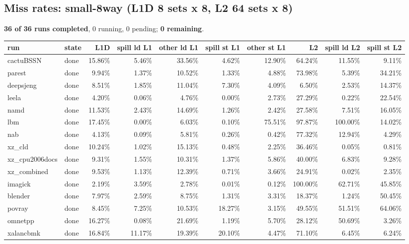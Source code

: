 \documentclass[10pt,a4paper,landscape]{article}
\begin{document}
\subsection*{Miss rates: small-8way (L1D 8 sets x 8, L2 64 sets x 8)}
\textbf{36 of 36 runs completed}, 0 running, 0 pending; \textbf{0 remaining}.\par
{\footnotesize
\begin{longtable}{llrrrrrrrr}
\toprule
run & state & L1D & spill ld L1 & other ld L1 & spill st L1 & other st L1 & L2 & spill ld L2 & spill st L2 \\
\midrule
\endhead
\bottomrule
\endfoot
cactuBSSN & done & 15.86\% & 5.46\% & 33.56\% & 4.62\% & 12.90\% & 64.24\% & 11.55\% & 9.11\% \\
parest & done & 9.94\% & 1.37\% & 10.52\% & 1.33\% & 4.88\% & 73.98\% & 5.39\% & 34.21\% \\
deepsjeng & done & 8.51\% & 1.85\% & 11.04\% & 7.30\% & 4.09\% & 6.50\% & 2.53\% & 14.37\% \\
leela & done & 4.20\% & 0.06\% & 4.76\% & 0.00\% & 2.73\% & 27.29\% & 0.22\% & 22.54\% \\
namd & done & 11.53\% & 2.43\% & 14.69\% & 1.26\% & 2.42\% & 27.58\% & 7.51\% & 16.05\% \\
lbm & done & 17.45\% & 0.00\% & 6.03\% & 0.10\% & 75.51\% & 97.87\% & 100.00\% & 14.02\% \\
nab & done & 4.13\% & 0.09\% & 5.81\% & 0.26\% & 0.42\% & 77.32\% & 12.94\% & 4.29\% \\
xz\_cld & done & 10.24\% & 1.02\% & 15.13\% & 0.48\% & 2.25\% & 36.46\% & 0.05\% & 0.81\% \\
xz\_cpu2006docs & done & 9.31\% & 1.55\% & 10.31\% & 1.37\% & 5.86\% & 40.00\% & 6.83\% & 9.28\% \\
xz\_combined & done & 9.53\% & 1.13\% & 12.39\% & 0.71\% & 3.66\% & 24.91\% & 0.02\% & 2.35\% \\
imagick & done & 2.19\% & 3.59\% & 2.78\% & 0.01\% & 0.12\% & 100.00\% & 62.71\% & 45.85\% \\
blender & done & 7.97\% & 2.59\% & 8.75\% & 1.31\% & 3.31\% & 18.37\% & 1.24\% & 50.45\% \\
povray & done & 8.45\% & 7.25\% & 10.53\% & 18.27\% & 3.15\% & 49.55\% & 51.51\% & 64.06\% \\
omnetpp & done & 16.27\% & 0.08\% & 21.69\% & 1.19\% & 5.70\% & 28.12\% & 50.69\% & 3.26\% \\
xalancbmk & done & 16.84\% & 11.17\% & 19.39\% & 20.10\% & 4.47\% & 71.10\% & 6.45\% & 6.24\% \\

\end{longtable}}
\end{document}
